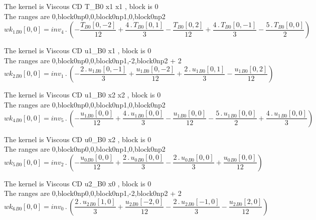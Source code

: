 \documentclass{article}
\begin{document}
\noindent The kernel is Viscous CD T_B0 x1 x1 , block is 0\\\noindent The ranges are 0,block0np0,0,block0np1,0,block0np2\\\begin{dmath}{wk_{1}{_{B0}}}[{0,0}] = inv_4 \,.\, \left(- \frac{{T{_{B0}}}[{0,-2}]}{12} + \frac{4 \,.\, {T{_{B0}}}[{0,1}]}{3} - \frac{{T{_{B0}}}[{0,2}]}{12} + \frac{4 \,.\, {T{_{B0}}}[{0,-1}]}{3} - \frac{5 \,.\, 
{T{_{B0}}}[{0,0}]}{2}\right)\end{dmath}

\noindent The kernel is Viscous CD u1_B0 x1 , block is 0\\\noindent The ranges are 0,block0np0,0,block0np1,-2,block0np2 + 2\\\begin{dmath}{wk_{2}{_{B0}}}[{0,0}] = inv_1 \,.\, \left(- \frac{2 \,.\, {u_{1}{_{B0}}}[{0,-1}]}{3} + \frac{{u_{1}{_{B0}}}[{0,-2}]}{12} + \frac{2 \,.\, {u_{1}{_{B0}}}[{0,1}]}{3} - \frac{{u_{1}{_{B0}}}[{0,2}]}{12}\right)\end{dmath}

\noindent The kernel is Viscous CD u1_B0 x2 x2 , block is 0\\\noindent The ranges are 0,block0np0,0,block0np1,0,block0np2\\\begin{dmath}{wk_{4}{_{B0}}}[{0,0}] = inv_5 \,.\, \left(- \frac{{u_{1}{_{B0}}}[{0,0}]}{12} + \frac{4 \,.\, {u_{1}{_{B0}}}[{0,0}]}{3} - \frac{{u_{1}{_{B0}}}[{0,0}]}{12} - \frac{5 \,.\, {u_{1}{_{B0}}}[{0,0}]}{2} + \frac{4 \,.\, 
{u_{1}{_{B0}}}[{0,0}]}{3}\right)\end{dmath}

\noindent The kernel is Viscous CD u0_B0 x2 , block is 0\\\noindent The ranges are 0,block0np0,0,block0np1,0,block0np2\\\begin{dmath}{wk_{5}{_{B0}}}[{0,0}] = inv_2 \,.\, \left(- \frac{{u_{0}{_{B0}}}[{0,0}]}{12} + \frac{2 \,.\, {u_{0}{_{B0}}}[{0,0}]}{3} - \frac{2 \,.\, {u_{0}{_{B0}}}[{0,0}]}{3} + \frac{{u_{0}{_{B0}}}[{0,0}]}{12}\right)\end{dmath}

\noindent The kernel is Viscous CD u2_B0 x0 , block is 0\\\noindent The ranges are 0,block0np0,0,block0np1,-2,block0np2 + 2\\\begin{dmath}{wk_{6}{_{B0}}}[{0,0}] = inv_0 \,.\, \left(\frac{2 \,.\, {u_{2}{_{B0}}}[{1,0}]}{3} + \frac{{u_{2}{_{B0}}}[{-2,0}]}{12} - \frac{2 \,.\, {u_{2}{_{B0}}}[{-1,0}]}{3} - \frac{{u_{2}{_{B0}}}[{2,0}]}{12}\right)\end{dmath}
\end{document}

